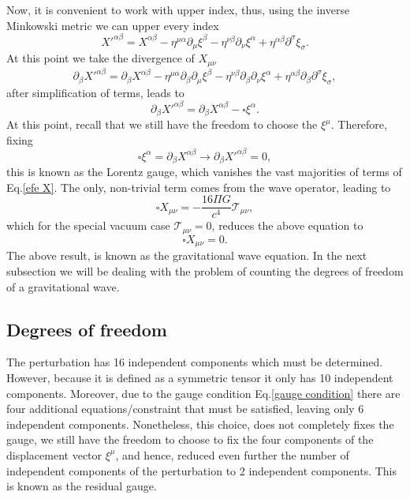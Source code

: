 \documentclass{article}
\begin{document}
Now, it is convenient to work with upper index, thus, using the inverse Minkowski metric we 
can upper every index
\begin{equation}
    X'^{\alpha\beta} = X^{\alpha\beta} - \eta^{\mu\alpha}\partial_{\mu}\xi^{\beta} 
    - \eta^{\nu\beta}\partial_{\nu}\xi^{\alpha} 
    + \eta^{\alpha\beta}\partial^{\sigma}\xi_{\sigma}.
\end{equation}
At this point we take the divergence of $X_{\mu\nu}$
\begin{equation}
    \partial_{\beta}X'^{\alpha\beta} = \partial_{\beta}X^{\alpha\beta}
    - \eta^{\mu\alpha}\partial_{\beta}\partial_{\mu}\xi^{\beta} 
    - \eta^{\nu\beta}\partial_{\beta}\partial_{\nu}\xi^{\alpha} 
    + \eta^{\alpha\beta}\partial_{\beta}\partial^{\sigma}\xi_{\sigma},
\end{equation}
after simplification of terms, leads to
\begin{equation}
    \partial_{\beta}X'^{\alpha\beta} = \partial_{\beta}X^{\alpha\beta}
    - \square \xi^{\alpha}.
\end{equation}
At this point, recall that we still have the freedom to choose the $\xi^{\mu}$. Therefore,
fixing 
\begin{equation}
    \label{gauge condition}
    \square \xi^{\alpha} = \partial_{\beta}X^{\alpha\beta} 
    \rightarrow \partial_{\beta}X'^{\alpha\beta} = 0,
\end{equation}
this is known as the Lorentz gauge, which vanishes the vast majorities of 
terms of Eq.\eqref{efe X}. The only, non-trivial term comes from the wave 
operator, leading to
\begin{equation}
    \square X_{\mu\nu} = -\frac{16\Pi G}{c^4}\mathcal{T}_{\mu\nu},
\end{equation}
which for the special vacuum case $\mathcal{T}_{\mu\nu} = 0$, reduces the 
above equation to 
\begin{equation}
    \square X_{\mu\nu} = 0.
\end{equation}
The above result, is known as the gravitational wave equation. In the next subsection we will
be dealing with the problem of counting the degrees of freedom of a gravitational wave.

\subsection{Degrees of freedom}

The perturbation has 16 independent components which must be determined. 
However, because it is defined as a symmetric tensor it only has 10 
independent components. Moreover, due to the gauge condition 
Eq.\eqref{gauge condition} there are four additional equations/constraint 
that must be satisfied, leaving only 6 independent components. Nonetheless, 
this choice, does not completely fixes the gauge, we still have the freedom 
to choose to fix the four components of the displacement vector $\xi^{\mu}$, 
and hence, reduced even further the number of independent components of the 
perturbation to 2 independent components. This is known as the residual gauge.
\end{document}
